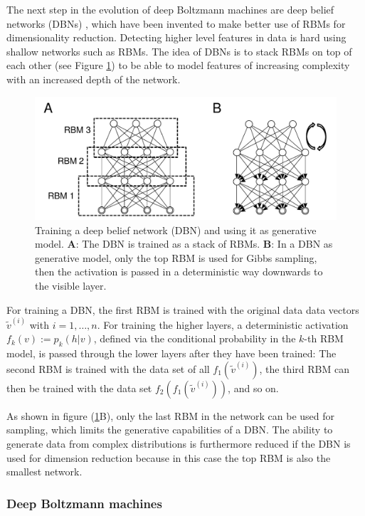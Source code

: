 \documentclass[12pt]{article}
\begin{document}
The next step in the evolution of deep Boltzmann machines are deep belief networks (DBNs) \citep{hinton_reducing_2006}, which have been invented to make better use of RBMs for dimensionality reduction.
Detecting higher level features in data is hard using shallow networks such as RBMs.
The idea of DBNs is to stack RBMs on top of each other (see Figure \ref{fig:dbn}) to be able to model features of increasing complexity with an increased depth of the network.

\begin{figure}[h]
   \centering
   \includegraphics[scale=0.7]{images/dbn.pdf}
   \caption{Training a deep belief network (DBN) and using it as generative model.
   {\bf A}: The DBN is trained as a stack of RBMs. {\bf B}: In a DBN as generative model, only the top RBM is used for Gibbs sampling, then the activation is passed in a deterministic way downwards to the visible layer.}
   \label{fig:dbn}
 \end{figure}

For training a DBN, the first RBM is trained with the original data data vectors $\tilde{v}^{(i)}$ with $i = 1, \dots, n$.
For training the higher layers, a deterministic activation $f_k(v) :=  p_k(h|v)$, defined via the conditional probability in the $k$-th RBM model, is passed through the lower layers after they have been trained:
The second RBM is trained with the data set of all $f_1(\tilde{v}^{(i)})$, the third RBM can then be trained with the data set $f_2(f_1(\tilde{v}^{(i)}))$, and so on.

As shown in figure (\ref{fig:dbn}B), only the last RBM in the network can be used for sampling, which limits the generative capabilities of a DBN.
The ability to generate data from complex distributions is furthermore reduced if the DBN is used for dimension reduction because in this case the top RBM is also the smallest network.


\subsubsection{Deep Boltzmann machines}\label{dbmprobs}
\end{document}
